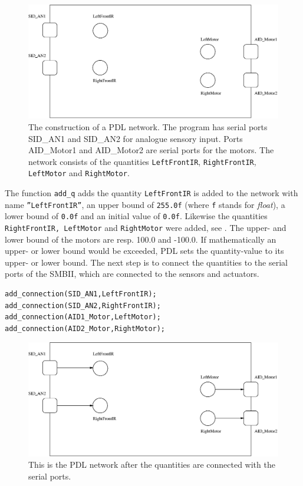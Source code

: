 \begin{figure}
\centerline{\includegraphics[width=12cm]{robots//pdl_networka.eps}}
\caption{The construction of a PDL network. The program has serial ports SID\_AN1 and SID\_AN2 for analogue sensory input. Ports AID\_Motor1 and AID\_Motor2 are serial ports for the motors. The network consists of the quantities \texttt{LeftFrontIR}, \texttt{RightFrontIR}, \texttt{LeftMotor} and \texttt{RightMotor}.}
\label{f:robots:pdl_networka}
\end{figure}

\bigskip\noindent
The function \texttt{add\_q} adds the quantity \texttt{LeftFrontIR} is added to the network with name \texttt{''LeftFrontIR''}, an upper bound of \texttt{255.0f} (where \texttt{f} stands for {\em float}), a lower bound of \texttt{0.0f} and an initial value of \texttt{0.0f}. Likewise the quantities \texttt{RightFrontIR, LeftMotor} and \texttt{RightMotor} were added, see . The upper- and lower bound of the motors are resp. 100.0 and -100.0. If mathematically an upper- or lower bound would be exceeded, PDL sets the quantity-value to its upper- or lower bound. The next step is to connect the quantities to the serial ports of the SMBII, which are connected to the sensors and actuators.


{\footnotesize\begin{verbatim}
add_connection(SID_AN1,LeftFrontIR);
add_connection(SID_AN2,RightFrontIR);
add_connection(AID1_Motor,LeftMotor);
add_connection(AID2_Motor,RightMotor);
\end{verbatim}}

\begin{figure}
\centerline{\includegraphics[width=12cm]{robots//pdl_networkb.eps}}
\caption{This is the PDL network after the quantities are connected with the serial ports.}
\label{f:robots:pdl_networkb}
\end{figure}



